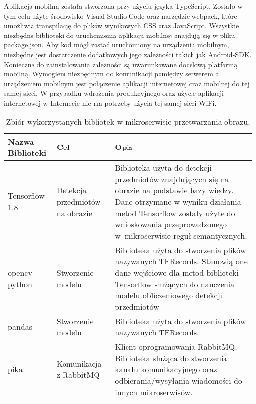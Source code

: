 Aplikacja mobilna została stworzona przy użyciu języka TypeScript. Zostało w tym celu użyte środowisko Visual Studio Code oraz narzędzie webpack, które umożliwia transpilację do plików wynikowych CSS oraz JavaScript. Wszystkie niezbędne biblioteki do uruchomienia aplikacji mobilnej znajdują się w pliku package.json. Aby kod mógł zostać uruchomiony na urządzeniu mobilnym, niezbędne jest dostarczenie dodatkowych jego zależności takich jak Android-SDK. Konieczne do zainstalowania zależności są uwarunkowane docelową platformą mobilną. Wymogiem niezbędnym do komunikacji pomiędzy serwerem a urządzeniem mobilnym jest połączenie aplikacji internetowej oraz mobilnej do tej samej sieci. W przypadku wdrożenia produkcyjnego oraz użycie aplikacji internetowej w Internecie nie ma potrzeby użycia tej samej sieci WiFi.
\newpage


\begin{center}
	\begin{longtable}{ | p{3.1cm} | p{4cm} | p{6.5cm} |}
		\caption{Zbiór wykorzystanych bibliotek w mikroserwisie przetwarzania obrazu.}
		\label{librariesPython} \\
		\hline Nazwa \newline Biblioteki & Cel & Opis \\ \hline    
		
		\hline Tensorflow 1.8 &
		Detekcja przedmiotów na obrazie
		
		& Biblioteka użyta do detekcji przedmiotów znajdujących się na obrazie na podstawie bazy wiedzy. Dane otrzymane w wyniku działania metod Tensorflow zostały użyte do wnioskowania przeprowadzonego w~mikroserwisie reguł semantycznych.\\ \hline


	\hline opencv-python &
	Stworzenie modelu
	
	& Biblioteka użyta do stworzenia plików nazywanych TFRecords. Stanowią one dane wejściowe dla metod biblioteki Tensorflow służących do nauczenia modelu obliczeniowego detekcji przedmiotów.\\ \hline	
	
	\hline pandas &
	Stworzenie modelu
	
	& Biblioteka użyta do stworzenia plików nazywanych TFRecords.\\ \hline	
	
	\hline pika &
	Komunikacja z \newline RabbitMQ
	
	& Klient oprogramowania RabbitMQ. Biblioteka służąca do stworzenia kanału komunikacyjnego oraz odbierania/wysyłania wiadomości do innych mikroserwisów.\\ \hline	
	
	\end{longtable}
\end{center}

